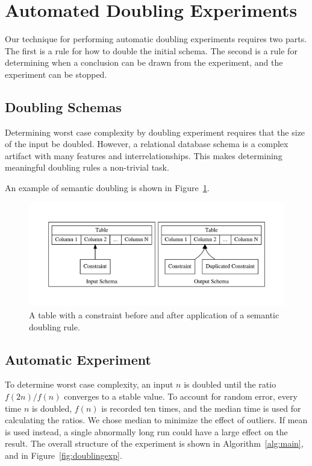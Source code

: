 \section{Automated Doubling Experiments}
  \label{sec:technique}

  Our technique for performing automatic doubling experiments requires
  two parts.  The first is a rule for how to double the initial schema.
  The second is a rule for determining when a conclusion can be drawn
  from the experiment, and the experiment can be stopped. 

  \subsection{Doubling Schemas}
  \label{subsec:doubling}

  Determining worst case complexity by doubling experiment requires that
  the size of the input be doubled.  However, a relational database
  schema is a complex artifact with many features and
  interrelationships. This makes determining meaningful doubling rules a 
  non-trivial task.

  An example of semantic doubling is shown in
  Figure~\ref{fig:semanticconstraint}.


\begin{figure}
\centering
  \centering
  \includegraphics[width=.5\linewidth]{../diagrams/semanticconstraint.pdf}
  \caption{A table with a constraint before and after application of a semantic
  doubling rule.}
  \label{fig:semanticconstraint}
\end{figure}


  \subsection{Automatic Experiment}
  \label{subsec:experiment}

To determine worst case complexity, an input $n$ is doubled until the 
ratio $f(2n) / f(n)$ converges to a stable value. To account for random
error, every time $n$ is doubled, $f(n)$ is recorded ten times, and the
median time is used for calculating the ratios.  We chose
median to minimize the effect of outliers. If mean is used instead, a
single abnormally long run could have a large effect on the result. The overall 
structure of the experiment is shown in Algorithm~\ref{alg:main}, and in
Figure~\ref{fig:doublingexp}.

